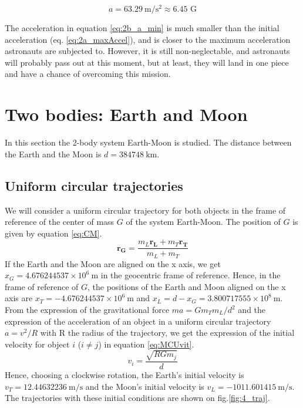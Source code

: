 \documentclass[a4paper,12pt,twoside]{article}
\begin{document}
\begin{equation}
  a = \SI{63.29}{\meter\per\square\second} \approx \num{6.45}\text{ G} %
  \label{eq:2b_a_min}
\end{equation}

The acceleration in equation \eqref{eq:2b_a_min} is much smaller than the initial acceleration (eq. \eqref{eq:2a_maxAccel}), and is closer to the maximum acceleration astronauts are subjected to.
However, it is still non-neglectable, and astronauts will probably pass out at this moment, but at least, they will land in one piece and have a chance of overcoming this mission.

\section{Two bodies: Earth and Moon}
In this section the 2-body system Earth-Moon is studied. The distance between the Earth and the Moon is $d = 384748 ~\si{\km}$.

\subsection{Uniform circular trajectories}
We will consider a uniform circular trajectory for both objects in the frame of reference of the center of mass $G$ of the system Earth-Moon. The position of $G$ is given by equation \eqref{eq:CM}.
\begin{equation}
\mathbf{r_G} = \frac{m_L \mathbf{r_L} + m_T \mathbf{r_T}}{m_L + m_T}
\label{eq:CM}
\end{equation}
If the Earth and the Moon are aligned on the x axis, we get $x_G = 4.676244537 \times 10^6 ~\si{\m}$ in the geocentric frame of reference. Hence, in the frame of reference of $G$, the positions of the Earth and Moon aligned on the x axis are $x_T = -4.676244537 \times 10^6 ~\si{\m}$ and $x_L = d-x_G = 3.800717555 \times 10^8 ~\si{\m}$.\\
From the expression of the gravitational force $ma = G m_T m_L/d^2$ and the expression of the acceleration of an object in a uniform circular trajectory $a = v^2/R$ with R the radius of the trajectory, we get the expression of the initial velocity for object $i$ ($i \neq j$) in equation \eqref{eq:MCUvit}.
\begin{equation}
v_i = \frac{\sqrt{RG m_j}}{d}
\label{eq:MCUvit}
\end{equation}
Hence, choosing a clockwise rotation, the Earth's initial velocity is $v_T = 12.44632236 ~\si{\m \per \s}$ and the Moon's initial velocity is $v_L = -1011.601415~\si{\m \per \s}$. The trajectories with these initial conditions are shown on fig.\ref{fig:4_traj}.
\end{document}
